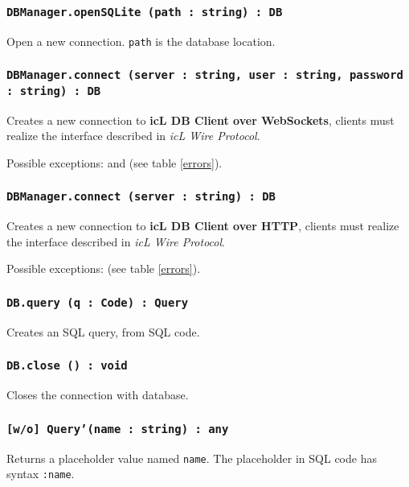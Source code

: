 \subsubsection{\texttt{DBManager.openSQLite (path : string) : DB}}

Open a new connection. \texttt{path} is the database location.

\subsubsection{\texttt{DBManager.connect (server : string, user : string, password : string) : DB}}

Creates a new connection to {\bf icL DB Client over WebSockets}, clients must realize the interface described in \textit{icL Wire Protocol}.

Possible exceptions:  and  (see table \ref{errors}).

\subsubsection{\texttt{DBManager.connect (server : string) : DB}}

Creates a new connection to {\bf icL DB Client over HTTP}, clients must realize the interface described in \textit{icL Wire Protocol}.

Possible exceptions:  (see table \ref{errors}).

\subsubsection{\texttt{DB.query (q : Code) : Query}}

Creates an SQL query, from SQL code.

\subsubsection{\texttt{DB.close () : void}}

Closes the connection with database.

\subsubsection{\texttt{[w/o] Query'(name : string) : any}}

Returns a placeholder value named \texttt{name}. 
The placeholder in SQL code has syntax \texttt{:name}.

